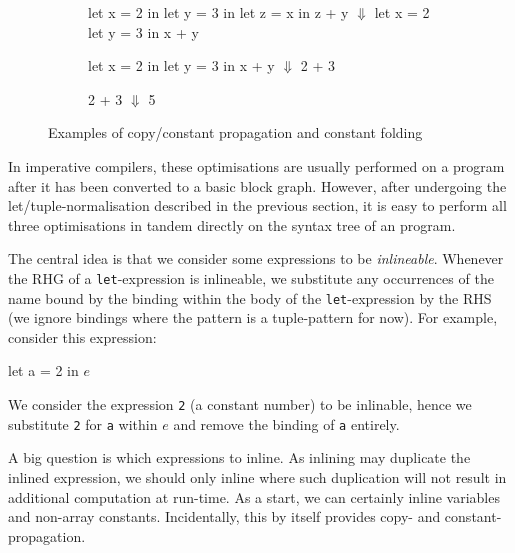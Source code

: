 \begin{figure}
\begin{subfigure}[t]{.33\textwidth}
\centering
\begin{colorcode}
let x = 2 in
let y = 3 in
let z = x in
z + y
  \(\Downarrow\)
let x = 2
let y = 3 in
x + y
\end{colorcode}
\end{subfigure}%
\begin{subfigure}[t]{.33\textwidth}
\centering
\begin{colorcode}
let x = 2 in
let y = 3 in
x + y
  \(\Downarrow\)
2 + 3
\end{colorcode}
\vspace{2.9\baselineskip}
\end{subfigure}%
\begin{subfigure}[t]{.33\textwidth}
\centering
\begin{colorcode}
2 + 3
  \(\Downarrow\)
5
\end{colorcode}
\vspace{4.7\baselineskip}
\end{subfigure}
\caption{Examples of copy/constant propagation and constant folding}
\label{fig:copy/constant-propagation/folding}
\end{figure}

In imperative compilers, these optimisations are usually performed on
a program after it has been converted to a basic block graph.
However, after undergoing the let/tuple-normalisation described in the
previous section, it is easy to perform all three optimisations in
tandem directly on the syntax tree of an \LO{} program.

The central idea is that we consider some expressions to be
\textit{inlineable}.  Whenever the RHG of a \texttt{let}-expression is
inlineable, we substitute any occurrences of the name bound by the
binding within the body of the \texttt{let}-expression by the RHS (we
ignore bindings where the pattern is a tuple-pattern for now).  For
example, consider this expression:
\begin{colorcode}
let a = 2 in
\(e\)
\end{colorcode}
We consider the expression \texttt{2} (a constant number) to be
inlinable, hence we substitute \texttt{2} for \texttt{a} within $e$
and remove the binding of \texttt{a} entirely.

A big question is which expressions to inline.  As inlining may
duplicate the inlined expression, we should only inline where such
duplication will not result in additional computation at run-time.  As
a start, we can certainly inline variables and non-array constants.
Incidentally, this by itself provides copy- and constant-propagation.

